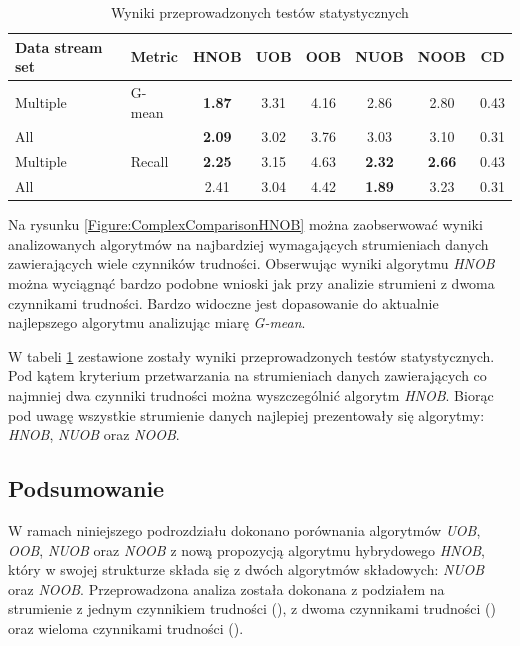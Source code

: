 \newpage

\begin{table}[ht]
\centering\small%
\setlength{\tabcolsep}{10pt} 
\renewcommand{\arraystretch}{1.5} 
\begin{tabular}{l l c c c c c c}
\toprule
Data stream set & Metric & HNOB & UOB & OOB & NUOB & NOOB & CD \\
\midrule
Multiple & G-mean & \textbf{1.87} & 3.31 & 4.16 & 2.86 & 2.80 & 0.43 \\
All  & & \textbf{2.09} & 3.02 & 3.76 & 3.03 & 3.10 & 0.31 \\
Multiple & Recall & \textbf{2.25} & 3.15 & 4.63 & \textbf{2.32} & \textbf{2.66} & 0.43\\
All  & & 2.41 & 3.04 & 4.42 & \textbf{1.89} & 3.23 & 0.31 \\
\bottomrule
\end{tabular}
\caption{Wyniki przeprowadzonych testów statystycznych}\label{Tab:ComplexFriedmanHNOB}
\end{table}

\noindent Na rysunku \ref{Figure:ComplexComparisonHNOB} można zaobserwować wyniki analizowanych algorytmów na najbardziej wymagających strumieniach danych zawierających wiele czynników trudności. Obserwując wyniki algorytmu \textit{HNOB} można wyciągnąć bardzo podobne wnioski jak przy analizie strumieni z dwoma czynnikami trudności. Bardzo widoczne jest dopasowanie do aktualnie najlepszego algorytmu analizując miarę \textit{G-mean}.

W tabeli \ref{Tab:ComplexFriedmanHNOB} zestawione zostały wyniki przeprowadzonych testów statystycznych. Pod kątem kryterium przetwarzania na strumieniach danych zawierających co najmniej dwa czynniki trudności można wyszczególnić algorytm \textit{HNOB}. Biorąc pod uwagę wszystkie strumienie danych najlepiej prezentowały się algorytmy: \textit{HNOB}, \textit{NUOB} oraz \textit{NOOB}.

\subsection{Podsumowanie}

\noindent W ramach niniejszego podrozdziału dokonano porównania algorytmów \textit{UOB}, \textit{OOB}, \textit{NUOB} oraz \textit{NOOB} z nową propozycją algorytmu hybrydowego \textit{HNOB}, który w swojej strukturze składa się z dwóch algorytmów składowych: \textit{NUOB} oraz \textit{NOOB}. Przeprowadzona analiza została dokonana z podziałem na strumienie z jednym czynnikiem trudności (), z dwoma czynnikami trudności () oraz wieloma czynnikami trudności ().

